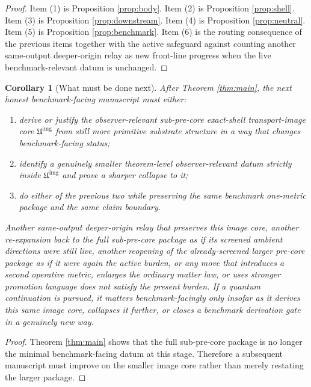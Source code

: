 \documentclass[11pt]{article}
\newcommand{\SubPreImageCore}{\mathfrak U^{\mathrm{img}}}
\newtheorem{corollary}{Corollary}
\begin{document}
\begin{proof}
Item (1) is Proposition \ref{prop:body}. Item (2) is Proposition \ref{prop:shell}. Item (3) is Proposition \ref{prop:downstream}. Item (4) is Proposition \ref{prop:neutral}. Item (5) is Proposition \ref{prop:benchmark}. Item (6) is the routing consequence of the previous items together with the active safeguard against counting another same-output deeper-origin relay as new front-line progress when the live benchmark-relevant datum is unchanged.
\end{proof}

\begin{corollary}[What must be done next]
\label{cor:next}
After Theorem \ref{thm:main}, the next honest benchmark-facing manuscript must either:
\begin{enumerate}
    \item derive or justify the observer-relevant sub-pre-core exact-shell transport-image core \(\SubPreImageCore\) from still more primitive substrate structure in a way that changes benchmark-facing status;
    \item identify a genuinely smaller theorem-level observer-relevant datum strictly inside \(\SubPreImageCore\) and prove a sharper collapse to it;
    \item do either of the previous two while preserving the same benchmark one-metric package and the same claim boundary.
\end{enumerate}
Another same-output deeper-origin relay that preserves this image core, another re-expansion back to the full sub-pre-core package as if its screened ambient directions were still live, another reopening of the already-screened larger pre-core package as if it were again the active burden, or any move that introduces a second operative metric, enlarges the ordinary matter law, or uses stronger promotion language does not satisfy the present burden. If a quantum continuation is pursued, it matters benchmark-facingly only insofar as it derives this same image core, collapses it further, or closes a benchmark derivation gate in a genuinely new way.
\end{corollary}

\begin{proof}
Theorem \ref{thm:main} shows that the full sub-pre-core package is no longer the minimal benchmark-facing datum at this stage. Therefore a subsequent manuscript must improve on the smaller image core rather than merely restating the larger package.
\end{proof}
\end{document}
